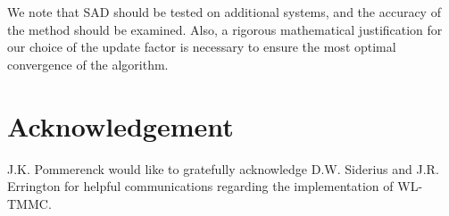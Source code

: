 \documentclass[letterpaper,twocolumn,amsmath,amssymb,pre,aps,10pt]{revtex4-1}
\newcommand{\blue}[1]{{\bf \color{blue} #1}}
\newcommand{\jpsays}[1]{{\color{red} [\blue{Jordan:} \emph{#1}]}}
\begin{document}
We note that SAD should be tested on additional systems, and the
accuracy of the method should be examined.  Also, a rigorous
mathematical justification for our choice of the update factor is
necessary to ensure the most optimal convergence of the algorithm.

\section{Acknowledgement}

J.K. Pommerenck would like to gratefully acknowledge D.W. Siderius and
J.R. Errington for helpful communications regarding the implementation
of WL-TMMC.



\end{document}
